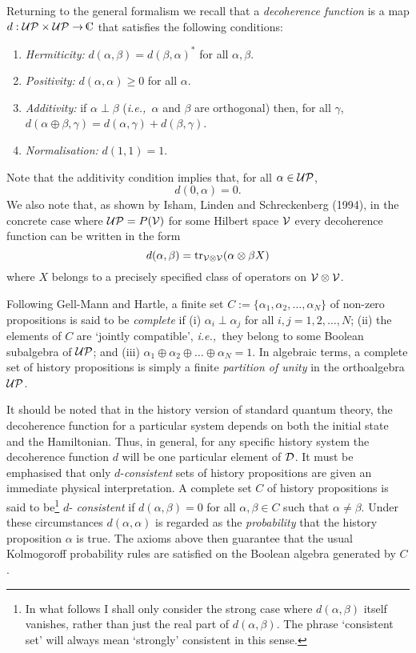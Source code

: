 \documentclass[12pt]{article}
\newcounter{def-number}[section]
\newcommand{\be}{\begin{enumerate}}
\newcommand{\ee}{\end{enumerate}}
\newcommand{\beq}{\begin{equation}}
\newcommand{\eeq}{\end{equation}}
\newcommand{\ie}{{\em i.e.,\ }}
\renewcommand{\a}{\alpha}                   %
\renewcommand{\b}{\beta}                    %
\newcommand{\g}{\gamma}
\newcommand{\map}{\rightarrow}
\newcommand\mathC{\mkern1mu\raise2.2pt\hbox{$\scriptscriptstyle|$}
                {\mkern-7mu\rm C}}
\newcommand{\D}{{\cal D}}
\newcommand{\UP}{{\cal UP}}
\newcommand{\V}{{\cal V}}
\begin{document}
	Returning to the general formalism we recall that a {\em
decoherence function\/} is a map $d:\UP\times\UP\map\mathC$ that
satisfies the following conditions:
\be
	\item {\em Hermiticity:} $d(\a,\b)=d(\b,\a)^*$ for all $\a,\b$.

	\item {\em Positivity:} $d(\a,\a)\geq 0$ for all $\a$.

	\item {\em Additivity:} if $\a\perp\b$ (\ie $\a$ and $\b$ are
orthogonal) then, for all $\g$,
$d(\a\oplus\b,\g)=d(\a,\g)+d(\b,\g)$. 

	\item {\em Normalisation:} $d(1,1)=1$.
\ee
Note that the additivity condition implies that, for all $\a\in\UP$,
\beq
			d(0,\a)=0.					\label{d0a=0}
\eeq
We also note that, as shown by Isham, Linden and Schreckenberg
(1994), in the concrete case where $\UP=P(\V)$ for some Hilbert space
$\V $ every decoherence function can be written in the form
\beq
		d(\a,\b)={\rm tr}_{\V\otimes\V}(\a\otimes\b X)
\eeq
where $X$ belongs to a precisely specified class of operators on
$\V\otimes\V$.

	Following Gell-Mann and Hartle, a finite set
$C:=\{\a_1,\a_2,\ldots,\a_N\}$ of non-zero propositions is said to
be {\em complete\/} if (i) $\a_i\perp\a_j$ for all
$i,j=1,2,\ldots,N$; (ii) the elements of $C$ are `jointly
compatible', \ie they belong to some Boolean subalgebra of $\UP$;
and (iii) $\a_1\oplus\a_2\oplus\ldots\oplus\a_N=1$. In algebraic
terms, a complete set of history propositions is simply a finite
{\em partition of unity\/} in the orthoalgebra $\UP$.
   
	It should be noted that in the history version of standard
quantum theory, the decoherence function for a particular system
depends on both the initial state and the Hamiltonian. Thus, in
general, for any specific history system the decoherence function
$d$ will be one particular element of $\D$. It must be emphasised
that only $d$-{\em consistent\/} sets of history propositions are
given an immediate physical interpretation.  A complete set $C$ of
history propositions is said to be\footnote{In what follows I shall
only consider the strong case where $d(\a,\b)$ itself vanishes,
rather than just the real part of $d(\a,\b)$. The phrase `consistent
set' will always mean `strongly' consistent in this sense.} $d$-{\em
consistent\/} if $d(\a,\b)=0$ for all $\a,\b\in C$ such that
$\a\ne\b$. Under these circumstances $d(\a,\a)$ is regarded as the
{\em probability\/} that the history proposition $\a$ is true.  The
axioms above then guarantee that the usual Kolmogoroff probability
rules are satisfied on the Boolean algebra generated by $C$.
\end{document}
